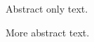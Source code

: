 \documentclass{article}
\begin{document}
\abstract Abstract only text.

More abstract text.
\end{document}
